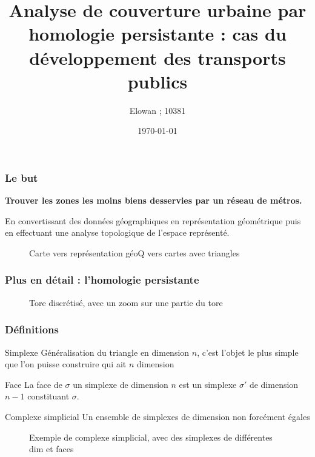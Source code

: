 \documentclass{beamer}
\begin{document}
\title{Analyse de couverture urbaine par homologie persistante : cas du 
    développement des transports publics}
\author{Elowan ; 10381}
\date{\today}

\maketitle

\begin{frame}
    \frametitle{Le but}    
    \textbf{Trouver les zones les moins biens desservies par un réseau de métros.}
    
    En convertissant des données géographiques en représentation géométrique
    puis en effectuant une analyse topologique de l'espace représenté.

    \begin{figure}
        \centering
        \caption{Carte vers représentation géoQ vers cartes avec triangles}
    \end{figure}
    
    
\end{frame}

\begin{frame}
    \frametitle{Plus en détail : l'homologie persistante}
    \begin{figure}
        \centering
        \caption{Tore discrétisé, avec un zoom sur une partie du tore}
    \end{figure}
\end{frame}

\begin{frame}
    \frametitle{Définitions}
    \begin{block}{Simplexe}
        Généralisation du triangle en dimension $n$, c'est l'objet le plus simple 
        que l'on puisse construire qui ait $n$ dimension
    \end{block}

    \begin{block}{Face}
        La face de $\sigma$ un simplexe de dimension $n$ est un simplexe $\sigma'$
        de dimension $n-1$ constituant $\sigma$.
    \end{block}

    \begin{block}{Complexe simplicial}
        Un ensemble de simplexes de dimension non forcément égales
    \end{block}

    \begin{figure}
        \centering
        \caption{Exemple de complexe simplicial, avec des simplexes de différentes dim et faces}
    \end{figure}
    
\end{frame}
\end{document}
